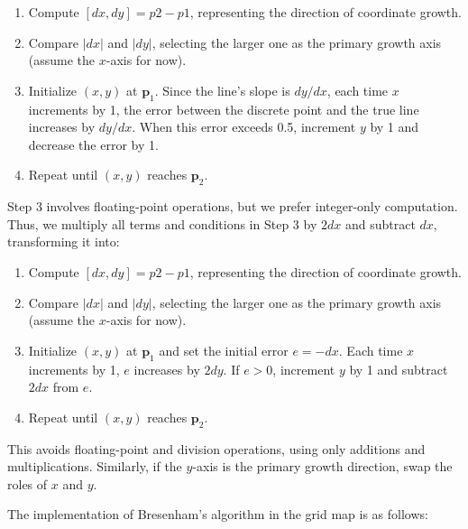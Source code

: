 \begin{enumerate}  
	\item Compute $[dx, dy] = p2 - p1$, representing the direction of coordinate growth.  
	\item Compare $|dx|$ and $|dy|$, selecting the larger one as the primary growth axis (assume the $x$-axis for now).  
	\item Initialize $(x, y)$ at $\bm{p}_1$. Since the line's slope is $dy/dx$, each time $x$ increments by 1, the error between the discrete point and the true line increases by $dy/dx$. When this error exceeds 0.5, increment $y$ by 1 and decrease the error by 1.  
	\item Repeat until $(x, y)$ reaches $\bm{p}_2$.  
\end{enumerate}  

Step 3 involves floating-point operations, but we prefer integer-only computation. Thus, we multiply all terms and conditions in Step 3 by $2dx$ and subtract $dx$, transforming it into:  

\begin{enumerate}  
	\item Compute $[dx, dy] = p2 - p1$, representing the direction of coordinate growth.  
	\item Compare $|dx|$ and $|dy|$, selecting the larger one as the primary growth axis (assume the $x$-axis for now).  
	\item Initialize $(x, y)$ at $\bm{p}_1$ and set the initial error $e = -dx$. Each time $x$ increments by 1, $e$ increases by $2dy$. If $e > 0$, increment $y$ by 1 and subtract $2dx$ from $e$.  
	\item Repeat until $(x, y)$ reaches $\bm{p}_2$.  
\end{enumerate}  

This avoids floating-point and division operations, using only additions and multiplications. Similarly, if the $y$-axis is the primary growth direction, swap the roles of $x$ and $y$.  

The implementation of Bresenham's algorithm in the grid map is as follows:  

